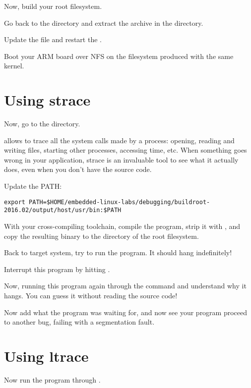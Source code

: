 Now, build your root filesystem.

Go back to the  directory
and extract the 
archive in the  directory.

Update the  file and restart the
.

Boot your ARM board over NFS on the filesystem produced with the same
kernel.

\section{Using strace}

Now, go to the  directory.

 allows to trace all the system calls made by a process:
opening, reading and writing files, starting other processes,
accessing time, etc. When something goes wrong in your application,
strace is an invaluable tool to see what it actually does, even when
you don't have the source code.


Update the PATH:
\footnotesize
\begin{verbatim}
export PATH=$HOME/embedded-linux-labs/debugging/buildroot-2016.02/output/host/usr/bin:$PATH
\end{verbatim}
\normalsize

With your cross-compiling toolchain, compile the
 program, strip it with
, and copy the resulting binary to the
 directory of the root filesystem.

Back to target system, try to run the 
program. It should hang indefinitely!

Interrupt this program by hitting \code{[Ctrl] [C]}.

Now, running this program again through the  command and
understand why it hangs. You can guess it without reading the source
code!

Now add what the program was waiting for, and now see your program
proceed to another bug, failing with a segmentation fault.

\section{Using ltrace}

Now run the program through .

